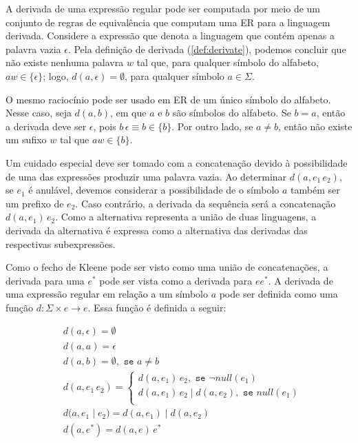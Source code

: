 A derivada de uma expressão regular pode ser computada por meio de um conjunto de regras de equivalência que computam uma ER para a linguagem derivada. Considere a expressão que denota a linguagem que contém apenas a palavra vazia $\epsilon$. Pela definição de derivada (\ref{def:derivate}), podemos concluir que não existe nenhuma palavra $w$ tal que, para qualquer símbolo do alfabeto, $aw \in \{\epsilon\}$; logo, $d(a,\epsilon) = \emptyset$, para qualquer símbolo $a \in \Sigma$.

O mesmo raciocínio pode ser usado em ER de um único símbolo do alfabeto. Nesse caso, seja $d(a,b)$, em que $a$ e $b$ são símbolos do alfabeto. Se $b=a$, então a derivada deve ser $\epsilon$, pois $b\,\epsilon \equiv b \in \{b\}$. Por outro lado, se $a \neq b$, então não existe um sufixo $w$ tal que $aw \in \{b\}$.

Um cuidado especial deve ser tomado com a concatenação devido à possibilidade de uma das expressões produzir uma palavra vazia. Ao determinar $d(a,e_1\,e_2)$, se $e_1$ é anulável, devemos considerar a possibilidade de o símbolo $a$ também ser um prefixo de $e_2$. Caso contrário, a derivada da sequência será a concatenação $d(a,e_1)\,e_2$. Como a alternativa representa a união de duas linguagens, a derivada da alternativa é expressa como a alternativa das derivadas das respectivas subexpressões.

Como o fecho de Kleene pode ser visto como uma união de concatenações, a derivada para uma $e^*$ pode ser vista como a derivada para $ee^*$. A derivada de uma expressão regular em relação a um símbolo $a$ pode ser definida como uma função $d : \Sigma \times e \to e$. Essa função é definida a seguir:

\begin{align*}
    & d(a,\epsilon) = \emptyset\\
    & d(a,a) = \epsilon\\
    & d(a,b) = \emptyset, \texttt{ se } a \neq b \\
    & d(a,e_1 \,e_2) = \left\{\begin{array}{l}
                               d(a,e_1)\,e_2, \texttt{ se } \neg null(e_1)\\
                               d(a,e_1)\,e_2 \;|\; d(a,e_2), \texttt{ se } null(e_1)\\
                          \end{array}\right.\\
    & d(a,e_1\;|\; e_2) = d(a,e_1) \;|\; d(a,e_2) \\
    & d(a,e^*) = d(a,e)\,e^* 
\end{align*}

